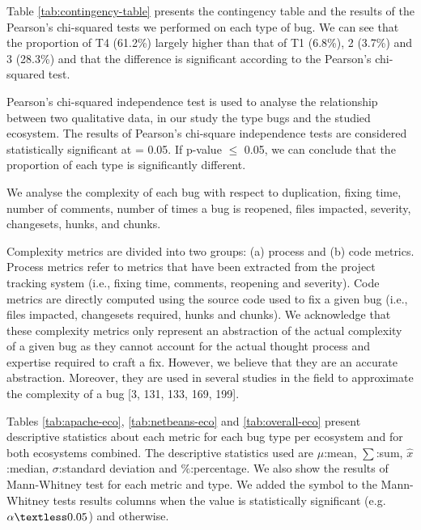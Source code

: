 \documentclass[12pt]{report}
\newcommand{\xmark}{\ding{55}}%
\begin{document}


Table \ref{tab:contingency-table} presents the contingency table and the
results of the Pearson's chi-squared tests we performed on each type of
bug. We can see that the proportion of T4 (61.2\%) largely higher than
that of T1 (6.8\%), 2 (3.7\%) and 3 (28.3\%) and that the difference is
significant according to the Pearson's chi-squared test.

Pearson's chi-squared independence test is used to analyse the
relationship between two qualitative data, in our study the type bugs
and the studied ecosystem. The results of Pearson's chi-square
independence tests are considered statistically significant at = 0.05.
If p-value \(\leq\) 0.05, we can conclude that the proportion of each
type is significantly different.

We analyse the complexity of each bug with respect to duplication,
fixing time, number of comments, number of times a bug is reopened,
files impacted, severity, changesets, hunks, and chunks.

Complexity metrics are divided into two groups: (a) process and (b) code
metrics. Process metrics refer to metrics that have been extracted from
the project tracking system (i.e., fixing time, comments, reopening and
severity). Code metrics are directly computed using the source code used
to fix a given bug (i.e., files impacted, changesets required, hunks and
chunks). We acknowledge that these complexity metrics only represent an
abstraction of the actual complexity of a given bug as they cannot
account for the actual thought process and expertise required to craft a
fix. However, we believe that they are an accurate abstraction.
Moreover, they are used in several studies in the field to approximate
the complexity of a bug {[}3, 131, 133, 169, 199{]}.

Tables \ref{tab:apache-eco}, \ref{tab:netbeans-eco} and
\ref{tab:overall-eco} present descriptive statistics about each metric
for each bug type per ecosystem and for both ecosystems combined. The
descriptive statistics used are \(\mu\):mean, \(\sum\):sum,
\(\hat{x}\):median, \(\sigma\):standard deviation and \(\%\):percentage.
We also show the results of Mann-Whitney test for each metric and type.
We added the \checkmark symbol to the Mann-Whitney tests results columns
when the value is statistically significant (e.g.
\(\alpha \textless 0.05\)) and \xmark otherwise.

 

\end{document}
